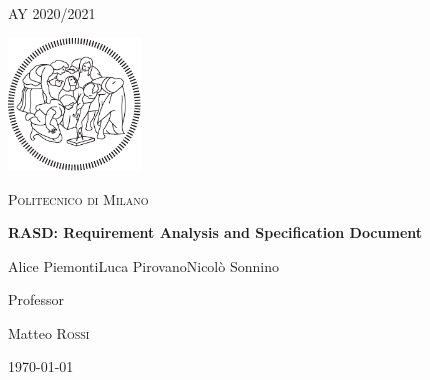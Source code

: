 \documentclass[table, 12pt]{article}
\begin{document}
\begin{titlepage}
    \centering
    {\scshape\large AY 2020/2021 \par}
    \vfill
    \includegraphics[width=100pt]{assets/logo-polimi-new}\par\vspace{1cm}
    {\scshape\LARGE Politecnico di Milano \par}
    \vspace{1.5cm}
    {\huge\bfseries RASD\@: Requirement Analysis
        and Specification Document \par}
    \vspace{2cm}
    {\Large {Alice Piemonti\quad Luca Pirovano\quad Nicolò Sonnino}\par}
    \vfill
    {\large Professor\par
        Matteo \textsc{Rossi}}
    \vfill
    {\large \today \par}
\end{titlepage}
\thispagestyle{plain}
\mbox{}
\newpage
{}
\tableofcontents
\newpage
{}
\end{document}
